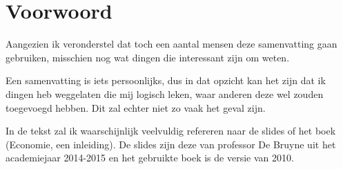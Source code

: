 \section*{Voorwoord}
Aangezien ik veronderstel dat toch een aantal mensen deze samenvatting gaan gebruiken, misschien nog wat dingen die interessant zijn om weten.

Een samenvatting is iets persoonlijks, dus in dat opzicht kan het zijn dat ik dingen heb weggelaten die mij logisch leken, waar anderen deze wel zouden toegevoegd hebben. Dit zal echter niet zo vaak het geval zijn.

In de tekst zal ik waarschijnlijk veelvuldig refereren naar de slides of het boek (Economie, een inleiding). De slides zijn deze van professor De Bruyne uit het academiejaar 2014-2015 en het gebruikte boek is de versie van 2010.
